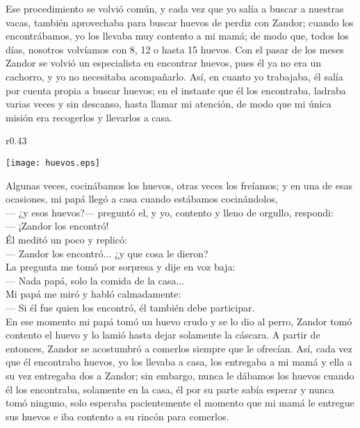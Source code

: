 Ese procedimiento se volvió común, y cada vez que yo salía a buscar a nuestras vacas, también aprovechaba para buscar huevos de perdiz con Zandor; cuando los encontrábamos, yo los llevaba muy contento a mi mamá; de modo que, todos los días, nosotros volvíamos con 8, 12 o hasta 15 huevos.
Con el pasar de los meses Zandor se volvió un especialista en encontrar huevos, pues él ya no era un cachorro, y yo no necesitaba acompañarlo. Así, en cuanto yo trabajaba, él salía por cuenta propia a buscar huevos; en el instante que él los encontraba, ladraba varias veces y sin descanso, hasta llamar mi atención, de modo que mi única misión era recogerlos y llevarlos a casa.
\ifdefined\EnableIncludeImages
\begin{wrapfigure}{r}{0.43\textwidth}
  \begin{center}
  \vspace{-20pt}
    \texttt{[image: huevos.eps]}
  \end{center}
  \vspace{-20pt}
\end{wrapfigure}
\fi
Algunas veces, cocinábamos los huevos, otras veces los freíamos; y en una de esas ocasiones, mi papá llegó a casa cuando estábamos cocinándolos,\\\indent
--- ¿y esos huevos?--- preguntó el, 
y yo, contento y lleno de orgullo, respondi:\\\indent
--- ¡Zandor los encontró!\\\indent
Él meditó un poco y replicó:\\\indent 
--- Zandor los encontró... ¿y que cosa le dieron?\\\indent 
La pregunta me tomó por sorpresa y dije en voz baja:\\\indent 
--- Nada papá, solo la comida de la casa...\\\indent
Mi papá me miró y habló calmadamente:\\\indent 
--- Si él fue quien los encontró, él también debe participar.\\\indent
En ese momento mi papá tomó un huevo crudo y se lo dio al perro, Zandor tomó contento el huevo y lo lamió hasta dejar solamente la cáscara. A partir de entonces, Zandor se acostumbró a comerlos siempre que le ofrecían. 
Así, cada vez que él encontraba huevos, yo los llevaba a casa, los entregaba a mi mamá y ella a su vez entregaba dos a Zandor; sin embargo, nunca le dábamos los huevos cuando él los encontraba, solamente en la casa, él por su parte sabía esperar y nunca tomó ninguno, solo esperaba pacientemente el momento que mi mamá le entregue sus huevos e iba contento a su rincón para comerlos.


